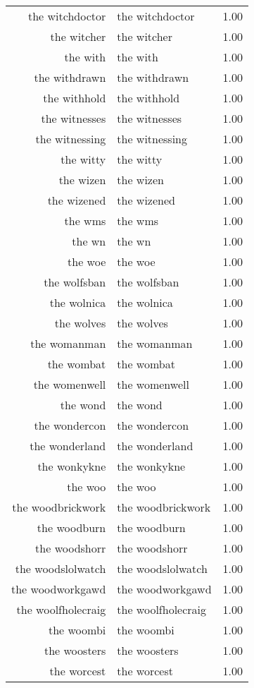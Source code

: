 \begin{table}[ht]
\begin{tabular}{rlr}
  the witchdoctor & the witchdoctor & 1.00 \\ 
  the witcher & the witcher & 1.00 \\ 
  the with & the with & 1.00 \\ 
  the withdrawn & the withdrawn & 1.00 \\ 
  the withhold & the withhold & 1.00 \\ 
  the witnesses & the witnesses & 1.00 \\ 
  the witnessing & the witnessing & 1.00 \\ 
  the witty & the witty & 1.00 \\ 
  the wizen & the wizen & 1.00 \\ 
  the wizened & the wizened & 1.00 \\ 
  the wms & the wms & 1.00 \\ 
  the wn & the wn & 1.00 \\ 
  the woe & the woe & 1.00 \\ 
  the wolfsban & the wolfsban & 1.00 \\ 
  the wolnica & the wolnica & 1.00 \\ 
  the wolves & the wolves & 1.00 \\ 
  the womanman & the womanman & 1.00 \\ 
  the wombat & the wombat & 1.00 \\ 
  the womenwell & the womenwell & 1.00 \\ 
  the wond & the wond & 1.00 \\ 
  the wondercon & the wondercon & 1.00 \\ 
  the wonderland & the wonderland & 1.00 \\ 
  the wonkykne & the wonkykne & 1.00 \\ 
  the woo & the woo & 1.00 \\ 
  the woodbrickwork & the woodbrickwork & 1.00 \\ 
  the woodburn & the woodburn & 1.00 \\ 
  the woodshorr & the woodshorr & 1.00 \\ 
  the woodslolwatch & the woodslolwatch & 1.00 \\ 
  the woodworkgawd & the woodworkgawd & 1.00 \\ 
  the woolfholecraig & the woolfholecraig & 1.00 \\ 
  the woombi & the woombi & 1.00 \\ 
  the woosters & the woosters & 1.00 \\ 
  the worcest & the worcest & 1.00 \\ 

\end{tabular}
\end{table}
